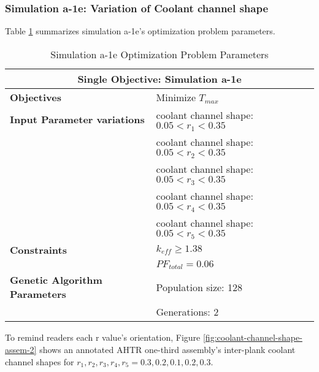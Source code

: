 \subsubsection{Simulation a-1e: Variation of Coolant channel shape}
Table \ref{tab:simulationa1e} summarizes simulation a-1e's optimization problem parameters. 
\begin{table}[htbp!]
    \centering
    \onehalfspacing
    \caption{Simulation a-1e Optimization Problem Parameters}
	\label{tab:simulationa1e}
    \footnotesize
    \begin{tabular}{l|p{6cm}}
    \hline 
    \multicolumn{2}{c}{\textbf{Single Objective: Simulation a-1e}} \\
    \hline 
    \textbf{Objectives} & Minimize $T_{max}$ \\
    \hline 
    \textbf{Input Parameter variations} 
    & coolant channel shape: $0.05<r_{1}<0.35$ \\
    & coolant channel shape: $0.05<r_{2}<0.35$ \\
    & coolant channel shape: $0.05<r_{3}<0.35$ \\
    & coolant channel shape: $0.05<r_{4}<0.35$ \\
    & coolant channel shape: $0.05<r_{5}<0.35$ \\
    \hline
    \textbf{Constraints} & $k_{eff} \geq 1.38$\\ 
    & $PF_{total} = 0.06 $\\ 
    \hline 
    \textbf{Genetic Algorithm Parameters} & Population size: 128 \\
    & Generations: 2 \\
    \hline
    \end{tabular}
\end{table}
To remind readers each r value's orientation, Figure 
\ref{fig:coolant-channel-shape-assem-2} shows an annotated \gls{AHTR} one-third 
assembly's inter-plank coolant channel shapes for 
$r_1, r_2, r_3, r_4, r_5 = 0.3, 0.2, 0.1, 0.2, 0.3$.

